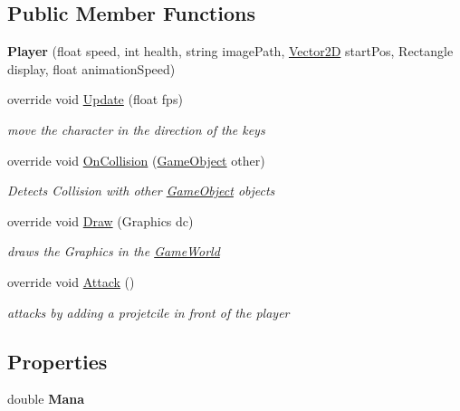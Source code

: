 \subsection*{Public Member Functions}
\begin{DoxyCompactItemize}
\item 
\hypertarget{class_mage_twinstick_1_1_player_ab0f3c00d033f0f20e743c04ae0eb6b11}{}{\bfseries Player} (float speed, int health, string image\+Path, \hyperlink{class_mage_twinstick_1_1_vector2_d}{Vector2\+D} start\+Pos, Rectangle display, float animation\+Speed)\label{class_mage_twinstick_1_1_player_ab0f3c00d033f0f20e743c04ae0eb6b11}

\item 
override void \hyperlink{class_mage_twinstick_1_1_player_a5324e0350784da0f66369ec5ef52516a}{Update} (float fps)
\begin{DoxyCompactList}\small\item\em move the character in the direction of the keys \end{DoxyCompactList}\item 
override void \hyperlink{class_mage_twinstick_1_1_player_adb9172ee6c160eb686076749d29be061}{On\+Collision} (\hyperlink{class_mage_twinstick_1_1_game_object}{Game\+Object} other)
\begin{DoxyCompactList}\small\item\em Detects Collision with other \hyperlink{class_mage_twinstick_1_1_game_object}{Game\+Object} objects \end{DoxyCompactList}\item 
override void \hyperlink{class_mage_twinstick_1_1_player_a2ccf76e50c0e5fa6642da04a4a5c4fa8}{Draw} (Graphics dc)
\begin{DoxyCompactList}\small\item\em draws the Graphics in the \hyperlink{class_mage_twinstick_1_1_game_world}{Game\+World} \end{DoxyCompactList}\item 
override void \hyperlink{class_mage_twinstick_1_1_player_a418c80bddb416cd2cdd180ab21831f57}{Attack} ()
\begin{DoxyCompactList}\small\item\em attacks by adding a projetcile in front of the player \end{DoxyCompactList}\end{DoxyCompactItemize}
\subsection*{Properties}
\begin{DoxyCompactItemize}
\item 
\hypertarget{class_mage_twinstick_1_1_player_a18f4e83174054293e8f60af4d66d2925}{}double {\bfseries Mana}\label{class_mage_twinstick_1_1_player_a18f4e83174054293e8f60af4d66d2925}

\end{DoxyCompactItemize}
